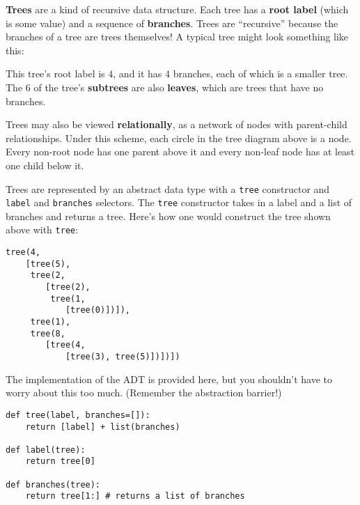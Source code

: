 \textbf{Trees} are a kind of recursive data structure. Each tree has a \textbf{root label} (which is some value) and a sequence of \textbf{branches}. Trees are ``recursive'' because the branches of a tree are trees themselves! A typical tree might look something like this: 

\begin{center}
\end{center}
This tree's root label is $4$, and it has 4 branches, each of which is a smaller tree. The $6$ of the tree's \textbf{subtrees} are also \textbf{leaves}, which are trees that have no branches. 

Trees may also be viewed \textbf{relationally}, as a network of nodes with parent-child relationships. Under this scheme, each circle in the tree diagram above is a node. Every non-root node has one parent above it and every non-leaf node has at least one child below it. 

Trees are represented by an abstract data type with a \lstinline{tree} constructor and \lstinline{label} and \lstinline{branches} selectors. The \lstinline{tree} constructor takes in a label and a list of branches and returns a tree. Here's how one would construct the tree shown above with \lstinline{tree}: 

\newpage
\begin{lstlisting}
tree(4,
    [tree(5),
     tree(2,
        [tree(2),
         tree(1,
            [tree(0)])]),
     tree(1),
     tree(8,
        [tree(4,
            [tree(3), tree(5)])])])
\end{lstlisting}

The implementation of the ADT is provided here, but you shouldn't have to worry about this too much. (Remember the abstraction barrier!)

\begin{lstlisting}
def tree(label, branches=[]):
	return [label] + list(branches)

def label(tree):
	return tree[0] 

def branches(tree):
	return tree[1:] # returns a list of branches
		
	\end{lstlisting}

